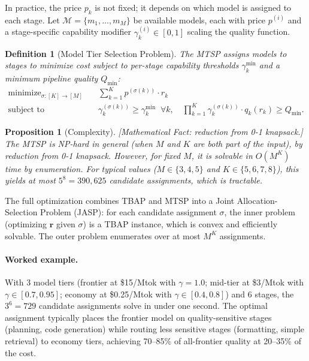 \documentclass[11pt, a4paper]{googledeepmind}
\DeclareMathOperator*{\minimize}{minimize}
\newtheorem{definition}{Definition}[section]
\newtheorem{proposition}{Proposition}[section]
\begin{document}
In practice, the price $p_k$ is not fixed; it depends on which model is assigned to each stage. Let $\mathcal{M} = \{m_1, \ldots, m_M\}$ be available models, each with price $p^{(i)}$ and a stage-specific capability modifier $\gamma_k^{(i)} \in [0,1]$ scaling the quality function.

\begin{definition}[Model Tier Selection Problem]
\label{def:econ-mtsp}
The \emph{MTSP} assigns models to stages to minimize cost subject to per-stage capability thresholds $\gamma_k^{\min}$ and a minimum pipeline quality $Q_{\min}$:
\begin{equation}\label{eq:econ-mtsp}
\begin{aligned}
    \minimize_{\sigma: [K] \to [M]} \quad & \sum_{k=1}^{K} p^{(\sigma(k))} \cdot r_k \\
    \text{subject to} \quad & \gamma_k^{(\sigma(k))} \geq \gamma_k^{\min} \;\; \forall k, \quad \prod_{k=1}^{K} \gamma_k^{(\sigma(k))} \cdot q_k(r_k) \geq Q_{\min}.
\end{aligned}
\end{equation}
\end{definition}

\begin{proposition}[Complexity]
\label{prop:econ-complexity}
\emph{[Mathematical Fact: reduction from 0-1 knapsack.]}
The MTSP is NP-hard in general (when $M$ and $K$ are both part of the input), by reduction from 0-1 knapsack. However, for fixed $M$, it is solvable in $O(M^K)$ time by enumeration. For typical values ($M \in \{3, 4, 5\}$ and $K \in \{5, 6, 7, 8\}$), this yields at most $5^8 = 390{,}625$ candidate assignments, which is tractable.
\end{proposition}

The full optimization combines TBAP and MTSP into a Joint Allocation-Selection Problem (JASP): for each candidate assignment $\sigma$, the inner problem (optimizing $\mathbf{r}$ given $\sigma$) is a TBAP instance, which is convex and efficiently solvable. The outer problem enumerates over at most $M^K$ assignments.

\paragraph{Worked example.} With 3 model tiers (frontier at \$15/Mtok with $\gamma = 1.0$; mid-tier at \$3/Mtok with $\gamma \in [0.7, 0.95]$; economy at \$0.25/Mtok with $\gamma \in [0.4, 0.8]$) and 6 stages, the $3^6 = 729$ candidate assignments solve in under one second. The optimal assignment typically places the frontier model on quality-sensitive stages (planning, code generation) while routing less sensitive stages (formatting, simple retrieval) to economy tiers, achieving 70--85\% of all-frontier quality at 20--35\% of the cost.
\end{document}
